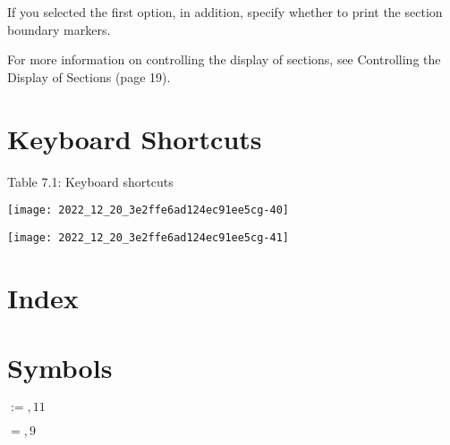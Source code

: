 If you selected the first option, in addition, specify whether to print the section boundary markers.

For more information on controlling the display of sections, see Controlling the Display of Sections (page 19).

\section{Keyboard Shortcuts}
Table 7.1: Keyboard shortcuts

\begin{center}
\texttt{[image: 2022\_12\_20\_3e2ffe6ad124ec91ee5cg-40]}
\end{center}

\begin{center}
\texttt{[image: 2022\_12\_20\_3e2ffe6ad124ec91ee5cg-41]}
\end{center}

\section{Index}
\section{Symbols}
$:=, 11$

$=, 9$

